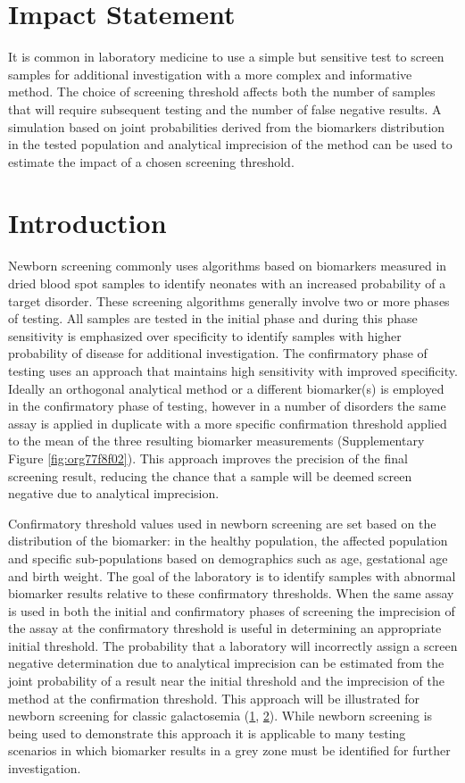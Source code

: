 \documentclass[review]{elsarticle}
\begin{document}
\section*{Impact Statement}
\label{sec:orgf779329}
It is common in laboratory medicine to use a simple but sensitive
test to screen samples for additional investigation with a more
complex and informative method. The choice of screening threshold
affects both the number of samples that will require subsequent
testing and the number of false negative results. A simulation based
on joint probabilities derived from the biomarkers distribution in
the tested population and analytical imprecision of the method can
be used to estimate the impact of a chosen screening threshold.

\section*{Introduction}
\label{sec:org2da0f4f}
Newborn screening commonly uses algorithms based on biomarkers
measured in dried blood spot samples to identify neonates with an
increased probability of a target disorder. These screening algorithms
generally involve two or more phases of testing. All samples are
tested in the initial phase and during this phase sensitivity is
emphasized over specificity to identify samples with higher
probability of disease for additional investigation. The confirmatory
phase of testing uses an approach that maintains high sensitivity
with improved specificity. Ideally an orthogonal analytical method or
a different biomarker(s) is employed in the confirmatory phase of
testing, however in a number of disorders the same assay is applied in
duplicate with a more specific confirmation threshold applied to the
mean of the three resulting biomarker measurements (Supplementary Figure
\ref{fig:org77f8f02}). This approach improves the precision of the final
screening result, reducing the chance that a sample will be deemed
screen negative due to analytical imprecision.

Confirmatory threshold values used in newborn screening are set based
on the distribution of the biomarker: in the healthy population, the
affected population and specific sub-populations based on demographics
such as age, gestational age and birth weight. The goal of the
laboratory is to identify samples with abnormal biomarker results
relative to these confirmatory thresholds. When the same assay is used
in both the initial and confirmatory phases of screening the
imprecision of the assay at the confirmatory threshold is useful in
determining an appropriate initial threshold. The probability that a
laboratory will incorrectly assign a screen negative determination due
to analytical imprecision can be estimated from the joint probability
of a result near the initial threshold and the imprecision of the
method at the confirmation threshold. This approach will be
illustrated for newborn screening for classic galactosemia (\hyperlink{citeproc_bib_item_1}{1}, \hyperlink{citeproc_bib_item_2}{2}). While newborn screening is being
used to demonstrate this approach it is applicable to many testing
scenarios in which biomarker results in a grey zone must be identified
for further investigation.
\end{document}
